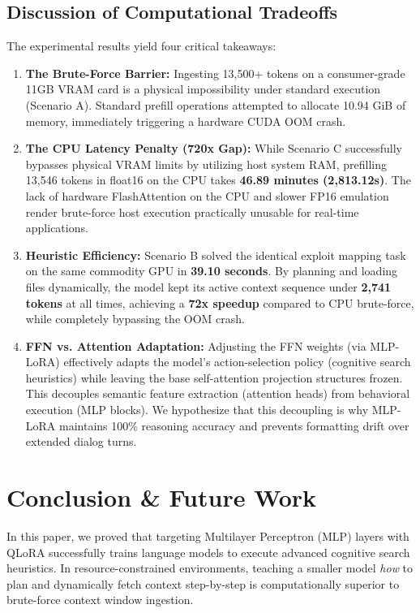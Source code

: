 \documentclass[10pt,twocolumn]{article}
\begin{document}
\subsection{Discussion of Computational Tradeoffs}
The experimental results yield four critical takeaways:
\begin{enumerate}
    \item \textbf{The Brute-Force Barrier:} Ingesting 13,500+ tokens on a consumer-grade 11GB VRAM card is a physical impossibility under standard execution (Scenario A). Standard prefill operations attempted to allocate 10.94 GiB of memory, immediately triggering a hardware CUDA OOM crash.
    \item \textbf{The CPU Latency Penalty (720x Gap):} While Scenario C successfully bypasses physical VRAM limits by utilizing host system RAM, prefilling 13,546 tokens in float16 on the CPU takes \textbf{46.89 minutes (2,813.12s)}. The lack of hardware FlashAttention on the CPU and slower FP16 emulation render brute-force host execution practically unusable for real-time applications.
    \item \textbf{Heuristic Efficiency:} Scenario B solved the identical exploit mapping task on the same commodity GPU in \textbf{39.10 seconds}. By planning and loading files dynamically, the model kept its active context sequence under \textbf{2,741 tokens} at all times, achieving a \textbf{72x speedup} compared to CPU brute-force, while completely bypassing the OOM crash.
    \item \textbf{FFN vs. Attention Adaptation:} Adjusting the FFN weights (via MLP-LoRA) effectively adapts the model's action-selection policy (cognitive search heuristics) while leaving the base self-attention projection structures frozen. This decouples semantic feature extraction (attention heads) from behavioral execution (MLP blocks). We hypothesize that this decoupling is why MLP-LoRA maintains 100\% reasoning accuracy and prevents formatting drift over extended dialog turns.
\end{enumerate}

\section{Conclusion \& Future Work}
In this paper, we proved that targeting Multilayer Perceptron (MLP) layers with QLoRA successfully trains language models to execute advanced cognitive search heuristics. In resource-constrained environments, teaching a smaller model \textit{how} to plan and dynamically fetch context step-by-step is computationally superior to brute-force context window ingestion. 
\end{document}
